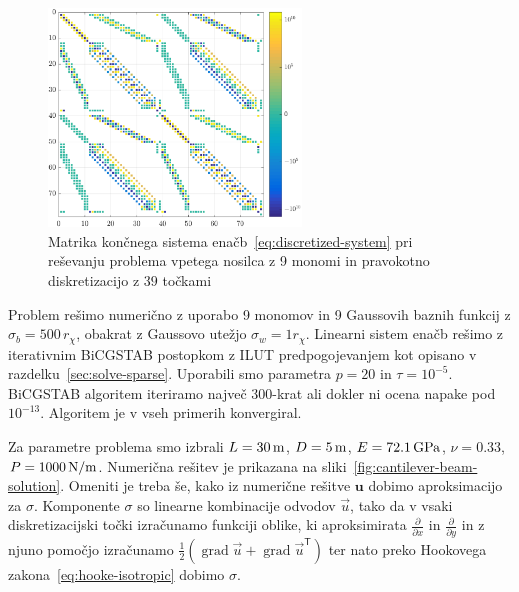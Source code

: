 \documentclass[12pt,a4paper,twoside]{article}
\theoremstyle{definition} %
\theoremstyle{plain} %
\numberwithin{equation}{section}
\newcommand{\T}{\mathsf{T}}
\newcommand{\grad}{\operatorname{grad}}
\renewcommand{\b}{\boldsymbol}
\newcommand{\dpar}[2]{\ensuremath{\frac{\partial #1}{\partial #2}}}
\newcommand{\vu}{\vec{u}}
\newcommand{\ts}{\sigma}
\begin{document}
\begin{figure}[!h]
  \centering
  \includegraphics[width=0.6\textwidth]{images/cantilever_beam_matrix_example.pdf}
  \caption[Matrika sistema enačb pri reševanju problema vpetega
  nosilca.]{Matrika končnega sistema enačb~\eqref{eq:discretized-system} pri
  reševanju problema vpetega nosilca z 9 monomi in pravokotno
  diskretizacijo z $39$ točkami}
  \label{fig:cantilever-beam-matrix}
\end{figure}

Problem rešimo numerično z uporabo 9 monomov in 9 Gaussovih baznih funkcij z $\sigma_b =
500\,r_\chi$, obakrat z Gaussovo utežjo $\sigma_w = 1 r_\chi$.
Linearni sistem enačb rešimo z iterativnim BiCGSTAB postopkom z ILUT predpogojevanjem
kot opisano v razdelku~\ref{sec:solve-sparse}. Uporabili smo parametra $p=20$ in $\tau = 10^{-5}$.
BiCGSTAB algoritem iteriramo največ 300-krat ali dokler ni ocena napake pod $10^{-13}$.
Algoritem je v vseh primerih konvergiral.

Za parametre problema smo izbrali $L = \unit[30]{m}$, $D = \unit[5]{m}$, $E = \unit[72.1]{GPa}$,
$\nu = 0.33$, $P = \unit[1000]{N/m}$.  Numerična rešitev je prikazana na
sliki~\ref{fig:cantilever-beam-solution}.  Omeniti je treba še, kako iz numerične rešitve $\b{u}$
dobimo aproksimacijo za $\ts$. Komponente $\ts$ so linearne kombinacije odvodov $\vu$, tako da v
vsaki diskretizacijski točki izračunamo funkciji oblike, ki aproksimirata $\dpar{}{x}$ in
$\dpar{}{y}$ in z njuno pomočjo izračunamo $\frac12 (\grad\vu + \grad\vu^\T)$ ter nato preko
Hookovega zakona~\eqref{eq:hooke-isotropic} dobimo $\ts$.
\end{document}
